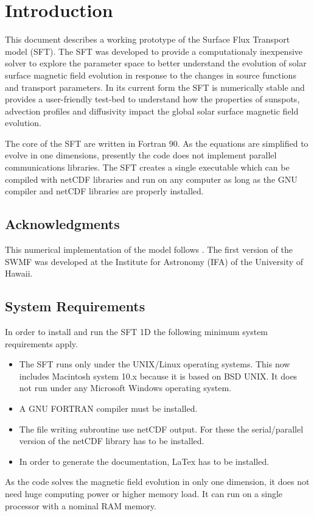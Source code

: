 \chapter{Introduction}

This document describes a working prototype of the 
Surface Flux Transport model (SFT).
The SFT was developed to provide a computationaly inexpensive solver to explore
the parameter space to better understand the evolution of solar surface magnetic field 
evolution in response to the changes in source functions and transport parameters. In 
its current form the SFT is numerically stable and provides a user-friendly test-bed to 
understand how the properties of sunspots, advection profiles and diffusivity impact the
global solar surface magnetic field evolution.

The core of the SFT are written in Fortran 90. As the equations are simplified to evolve in
one dimensions, presently the code does not implement parallel communications libraries.
The SFT creates a single executable which can be compiled with netCDF libraries and run on any 
computer as long as the GNU compiler and netCDF libraries are properly installed.

\section*{Acknowledgments}

This numerical implementation of the model follows \citet{Yeates2020SoPh}. The first version of the SWMF was developed at the Institute for Astronomy (IFA) of the University of Hawaii. 

\section{System Requirements}

In order to install and run the SFT 1D the following minimum system
requirements apply.
\begin{itemize}
\item The SFT runs only under the UNIX/Linux operating systems.  This now
  includes Macintosh system 10.x because it is based on BSD UNIX.  It does not run under any Microsoft Windows operating system.
\item A GNU FORTRAN compiler must be installed.
\item The file writing subroutine use netCDF output. For these the serial/parallel version of the netCDF library has to be installed. 
\item In order to generate the documentation, LaTex has to be installed.
\end{itemize}
As the code solves the magnetic field evolution in only one dimension, it does not need huge computing power or higher memory load. It can run on a single processor with a nominal RAM memory.

